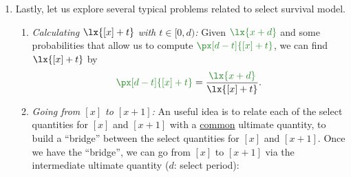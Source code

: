\begin{enumerate}
\item Lastly, let us explore several typical problems related to select
survival model.
\begin{enumerate}
\item \label{it:select-lxt} \emph{Calculating \(\lx{[x]+t}\) with
\(t\in[0,d)\):} Given \(\gc{\lx{x+d}}\) and some probabilities that allow us to
compute \(\gc{\px[d-t]{[x]+t}}\), we can find \(\lx{[x]+t}\) by
\[
\gc{\px[d-t]{[x]+t}}=\frac{\gc{\lx{x+d}}}{\lx{[x]+t}}.
\]
\item \label{it:select-at-x-to-xp1} \emph{Going from \([x]\) to \([x+1]\):} An
useful idea is to relate each of the select quantities for \([x]\) and
\([x+1]\) with a \underline{common} ultimate quantity, to build a ``bridge''
between the select quantities for \([x]\) and \([x+1]\). Once we have the
``bridge'', we can go from \([x]\) to \([x+1]\) via the intermediate ultimate
quantity (\(d\): select period):
\begin{center}
\end{center}
\end{enumerate}
\end{enumerate}
